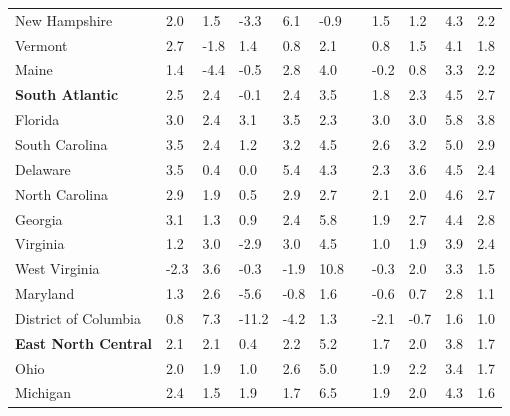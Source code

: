 {\begin{tabular}{p{29mm} R{8.4mm} R{8.4mm} R{8.4mm} R{8.4mm} 
             R{8.4mm} p{0mm} R{7.6mm} R{7.8mm} R{7.8mm} R{8.0mm} }
\hspace{3mm}  New Hampshire  & 2.0 & 1.5 & -3.3 & 6.1 & -0.9 &  & 1.5 & 1.2 & 4.3 & 2.2\\
\hspace{3mm}  Vermont  & 2.7 & -1.8 & 1.4 & 0.8 & 2.1 &  & 0.8 & 1.5 & 4.1 & 1.8\\
\hspace{3mm}  Maine  & 1.4 & -4.4 & -0.5 & 2.8 & 4.0 &  & -0.2 & 0.8 & 3.3 & 2.2\\
\hspace{1mm} \textbf{South Atlantic}  & 2.5 & 2.4 & -0.1 & 2.4 & 3.5 &  & 1.8 & 2.3 & 4.5 & 2.7 \\
\hspace{3mm}  Florida  & 3.0 & 2.4 & 3.1 & 3.5 & 2.3 &  & 3.0 & 3.0 & 5.8 & 3.8\\
\hspace{3mm}  South Carolina  & 3.5 & 2.4 & 1.2 & 3.2 & 4.5 &  & 2.6 & 3.2 & 5.0 & 2.9\\
\hspace{3mm}  Delaware  & 3.5 & 0.4 & 0.0 & 5.4 & 4.3 &  & 2.3 & 3.6 & 4.5 & 2.4\\
\hspace{3mm}  North Carolina  & 2.9 & 1.9 & 0.5 & 2.9 & 2.7 &  & 2.1 & 2.0 & 4.6 & 2.7\\
\hspace{3mm}  Georgia  & 3.1 & 1.3 & 0.9 & 2.4 & 5.8 &  & 1.9 & 2.7 & 4.4 & 2.8\\
\hspace{3mm}  Virginia  & 1.2 & 3.0 & -2.9 & 3.0 & 4.5 &  & 1.0 & 1.9 & 3.9 & 2.4\\
\hspace{3mm}  West Virginia  & -2.3 & 3.6 & -0.3 & -1.9 & 10.8 &  & -0.3 & 2.0 & 3.3 & 1.5\\
\hspace{3mm}  Maryland  & 1.3 & 2.6 & -5.6 & -0.8 & 1.6 &  & -0.6 & 0.7 & 2.8 & 1.1\\
\hspace{3mm}  District of Columbia  & 0.8 & 7.3 & -11.2 & -4.2 & 1.3 &  & -2.1 & -0.7 & 1.6 & 1.0\\
\hspace{1mm} \textbf{East North Central}  & 2.1 & 2.1 & 0.4 & 2.2 & 5.2 &  & 1.7 & 2.0 & 3.8 & 1.7 \\
\hspace{3mm}  Ohio  & 2.0 & 1.9 & 1.0 & 2.6 & 5.0 &  & 1.9 & 2.2 & 3.4 & 1.7\\
\hspace{3mm}  Michigan  & 2.4 & 1.5 & 1.9 & 1.7 & 6.5 &  & 1.9 & 2.0 & 4.3 & 1.6\\

\end{tabular}}
